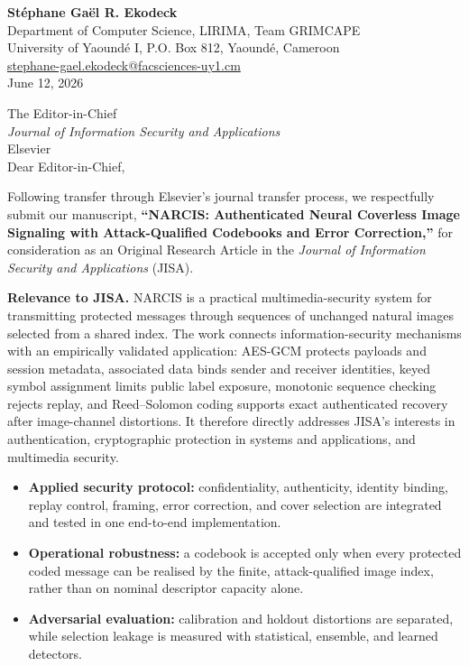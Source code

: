 \documentclass[10pt,letterpaper]{article}
\newcommand{\clhead}[1]{\textcolor{sectionblue}{\textbf{#1}}}
\begin{document}
\begin{flushright}
\textbf{St\'ephane Ga\"el R. Ekodeck}\\
Department of Computer Science, LIRIMA, Team GRIMCAPE\\
University of Yaound\'e I, P.O. Box 812, Yaound\'e, Cameroon\\
\href{mailto:stephane-gael.ekodeck@facsciences-uy1.cm}
{stephane-gael.ekodeck@facsciences-uy1.cm}\\
June 12, 2026
\end{flushright}

The Editor-in-Chief\\
\textit{Journal of Information Security and Applications}\\
Elsevier\\

Dear Editor-in-Chief,

Following transfer through Elsevier's journal transfer process, we
respectfully submit our manuscript, \textbf{``NARCIS: Authenticated Neural
Coverless Image Signaling with Attack-Qualified Codebooks and Error
Correction,''} for consideration as an Original Research Article in the
\textit{Journal of Information Security and Applications} (JISA).

\clhead{Relevance to JISA.}
NARCIS is a practical multimedia-security system for transmitting protected
messages through sequences of unchanged natural images selected from a shared
index. The work connects information-security mechanisms with an empirically
validated application: AES-GCM protects payloads and session metadata,
associated data binds sender and receiver identities, keyed symbol assignment
limits public label exposure, monotonic sequence checking rejects replay, and
Reed--Solomon coding supports exact authenticated recovery after image-channel
distortions. It therefore directly addresses JISA's interests in
authentication, cryptographic protection in systems and applications, and
multimedia security.

\begin{itemize}
\item \textbf{Applied security protocol:} confidentiality, authenticity,
identity binding, replay control, framing, error correction, and cover
selection are integrated and tested in one end-to-end implementation.
\item \textbf{Operational robustness:} a codebook is accepted only when every
protected coded message can be realised by the finite, attack-qualified image
index, rather than on nominal descriptor capacity alone.
\item \textbf{Adversarial evaluation:} calibration and holdout distortions are
separated, while selection leakage is measured with statistical, ensemble,
and learned detectors.
\end{itemize}
\end{document}
